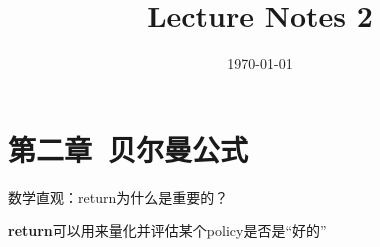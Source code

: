 \documentclass{article}
\begin{document}
\title{Lecture Notes 2}
\author{}
\date{\today}
\maketitle
\section{第二章\ 贝尔曼公式}
数学直观：return为什么是重要的？

\textbf{return}可以用来量化并评估某个policy是否是“好的”
\end{document}
